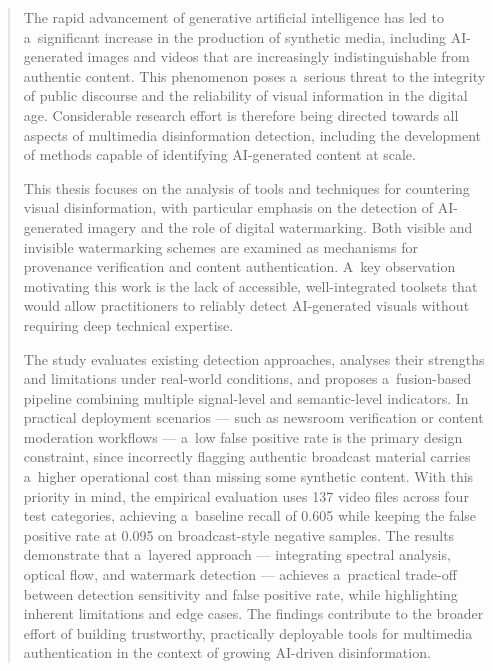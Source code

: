 \documentclass[pl,12pt,openany]{TAGH/t_agh_av}
\author{Bart\l{}omiej Pomiet\l{}o}
\date{2026}
\begin{document}
\titlepages
{}

\begin{abstract}
The rapid advancement of generative artificial intelligence has led to a~significant
increase in the production of synthetic media, including AI-generated images and videos
that are increasingly indistinguishable from authentic content. This phenomenon poses
a~serious threat to the integrity of public discourse and the reliability of visual
information in the digital age. Considerable research effort is therefore being directed
towards all aspects of multimedia disinformation detection, including the development
of methods capable of identifying AI-generated content at scale.

This thesis focuses on the analysis of tools and techniques for countering visual
disinformation, with particular emphasis on the detection of AI-generated imagery
and the role of digital watermarking. Both visible and invisible watermarking schemes
are examined as mechanisms for provenance verification and content authentication.
A~key observation motivating this work is the lack of accessible, well-integrated
toolsets that would allow practitioners to reliably detect AI-generated visuals
without requiring deep technical expertise.

The study evaluates existing detection approaches, analyses their strengths and
limitations under real-world conditions, and proposes a~fusion-based pipeline
combining multiple signal-level and semantic-level indicators. In practical deployment
scenarios --- such as newsroom verification or content moderation workflows ---
a~low false positive rate is the primary design constraint, since incorrectly
flagging authentic broadcast material carries a~higher operational cost than
missing some synthetic content. With this priority in mind, the empirical
evaluation uses 137 video files across four test categories, achieving a~baseline
recall of 0.605 while keeping the false positive rate at 0.095 on broadcast-style
negative samples. The results demonstrate that a~layered approach --- integrating
spectral analysis, optical flow, and watermark detection --- achieves a~practical
trade-off between detection sensitivity and false positive rate, while highlighting
inherent limitations and edge cases.
The findings contribute to the broader effort of building trustworthy, practically
deployable tools for multimedia authentication in the context of growing AI-driven disinformation.
\end{abstract}
\end{document}
